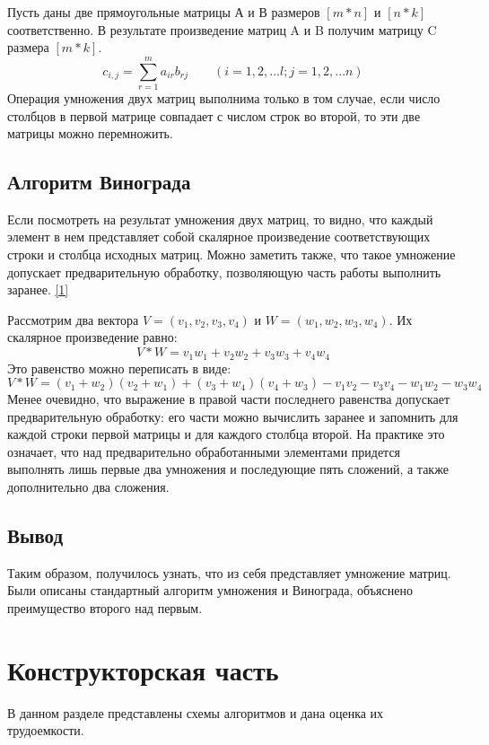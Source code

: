 \documentclass[12pt]{report}
\begin{document}
	Пусть даны две прямоугольные матрицы А и В размеров $[m * n]$ и $[n * k]$ соответственно.  
	В результате произведение матриц A и B получим матрицу C размера $[m *  k]$.
		\begin{equation}
		c_{i,j} = \sum_{r=1}^{m}a_{ir}b_{rj} \qquad (i=1,2,...l; j = 1,2,...n)
	\end{equation}
	Операция умножения двух матриц выполнима только в том случае, если число столбцов в первой матрице совпадает с числом строк во второй, то эти две матрицы можно перемножить.
	

	\section{Алгоритм Винограда}
	Если посмотреть на результат умножения двух матриц, то видно, что каждый элемент в нем представляет собой скалярное произведение соответствующих строки и столбца исходных матриц. Можно заметить также, что такое умножение допускает предварительную обработку, позволяющую часть работы выполнить заранее. \hyperref[literature]{[1]}\par
	Рассмотрим два вектора $V = (v_{1},v_{2},v_{3},v_{4})$ и $W = (w_{1},w_{2},w_{3},w_{4})$. Их скалярное произведение равно:
	\begin{equation}
		V * W = v_{1}w_{1} + v_{2}w_{2} + v_{3}w_{3} + v_{4}w_{4}
	\end{equation}
	Это равенство можно переписать в виде:
	\begin{equation}
		V * W = (v_{1} + w_{2})(v_{2} + w_{1}) + (v_{3} + w_{4})(v_{4} + w_{3}) -  v_{1}v_{2} - v_{3}v_{4} - w_{1}w_{2} - w_{3}w_{4}
	\end{equation}
	Менее очевидно, что выражение в правой части последнего равенства допускает предварительную обработку: его части можно вычислить заранее и запомнить для каждой строки первой матрицы и для каждого столбца второй. На практике это означает, что над предварительно обработанными элементами придется выполнять лишь первые два умножения и последующие пять сложений, а также дополнительно два сложения. 
	
	\section*{Вывод}
	Таким образом, получилось узнать, что из себя представляет умножение матриц. Были описаны стандартный алгоритм умножения и Винограда, объяснено преимущество второго над первым.
	
	\chapter{Конструкторская часть}
	В данном разделе представлены схемы алгоритмов и дана оценка их трудоемкости.
	
\end{document}
